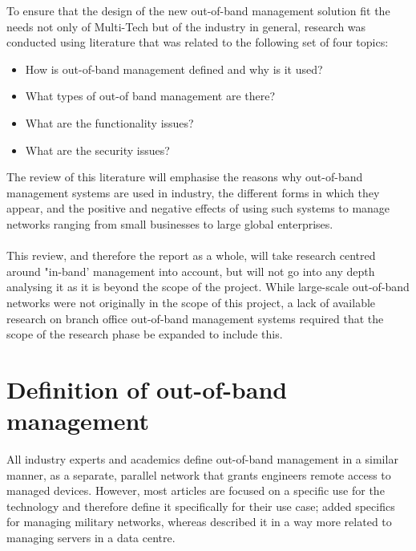 To ensure that the design of the new out-of-band management solution fit the needs not only of Multi-Tech but of the industry in general, research was conducted using literature that was related to the following set of four topics:
\begin{itemize}
    \item How is out-of-band management defined and why is it used?
    \item What types of out-of band management are there?
    \item What are the functionality issues?
    \item What are the security issues?
\end{itemize}
The review of this literature will emphasise the reasons why out-of-band management systems are used in industry, the different forms in which they appear, and the positive and negative effects of using such systems to manage networks ranging from small businesses to large global enterprises. \\\\
This review, and therefore the report as a whole, will take research centred around "in-band' management into account, but will not go into any depth analysing it as it is beyond the scope of the project. While large-scale out-of-band networks were not originally in the scope of this project, a lack of available research on branch office out-of-band management systems required that the scope of the research phase be expanded to include this.

\section{Definition of out-of-band management}
\label{section:lit-definition}
All industry experts and academics define out-of-band management in a similar manner, as a separate, parallel network that grants engineers remote access to managed devices. However, most articles are focused on a specific use for the technology and therefore define it specifically for their use case; \cite{1606042} added specifics for managing military networks, whereas \cite{211239} described it in a way more related to managing servers in a data centre.

